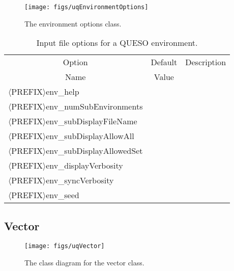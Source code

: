 \begin{figure}[h!]
\begin{center}
\texttt{[image: figs/uqEnvironmentOptions]}
\end{center}
\caption{
The environment options class.
}
\label{fig-env-options-class}
\end{figure}

\begin{table}[!h]
\begin{center}
\begin{tabular}{|l|c|c|}
\hline
\multicolumn{1}{|c|}{Option}                      & Default & Description \\
\multicolumn{1}{|c|}{Name}                        & Value   &             \\
\hline
\hline
$\langle$PREFIX$\rangle$env\_help                 &         &             \\
\hline
$\langle$PREFIX$\rangle$env\_numSubEnvironments   &         &             \\
\hline
$\langle$PREFIX$\rangle$env\_subDisplayFileName   &         &             \\
\hline
$\langle$PREFIX$\rangle$env\_subDisplayAllowAll   &         &             \\
\hline
$\langle$PREFIX$\rangle$env\_subDisplayAllowedSet &         &             \\
\hline
$\langle$PREFIX$\rangle$env\_displayVerbosity     &         &             \\
\hline
$\langle$PREFIX$\rangle$env\_syncVerbosity        &         &             \\
\hline
$\langle$PREFIX$\rangle$env\_seed                 &         &             \\
\hline
\end{tabular}
\end{center}
\caption{
Input file options for a QUESO environment.
}
\label{tab-env-options}
\end{table}

\clearpage
\subsection{Vector}

\begin{figure}[h!]
\centerline{
\texttt{[image: figs/uqVector]}
}
\caption{
The class diagram for the vector class.
}
\label{fig-vector-class}
\end{figure}

